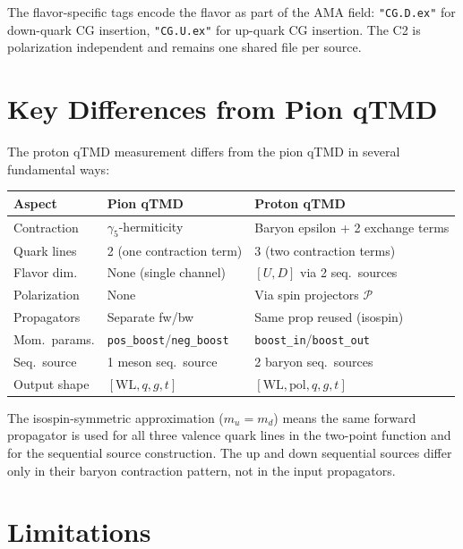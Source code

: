 \documentclass[11pt,a4paper]{article}
\begin{document}
The flavor-specific tags encode the flavor as part of the AMA field:
\texttt{"CG.D.ex"} for down-quark CG insertion, \texttt{"CG.U.ex"} for up-quark
CG insertion.  The C2 is polarization independent and remains one shared file
per source.

\section{Key Differences from Pion qTMD}
\label{sec:differences}

The proton qTMD measurement differs from the pion qTMD in several fundamental ways:

\begin{center}
  \begin{tabular}{l|l|l}
    Aspect & Pion qTMD & Proton qTMD \\
    \hline
    Contraction & $\gamma_5$-hermiticity & Baryon epsilon + 2 exchange terms \\
    Quark lines & 2 (one contraction term) & 3 (two contraction terms) \\
    Flavor dim. & None (single channel) & $[U, D]$ via 2 seq.\ sources \\
    Polarization & None & Via spin projectors $\mathcal{P}$ \\
    Propagators & Separate fw/bw & Same prop reused (isospin) \\
    Mom.\ params. & \texttt{pos\_boost}/\texttt{neg\_boost} &
      \texttt{boost\_in}/\texttt{boost\_out} \\
    Seq.\ source & 1 meson seq.\ source & 2 baryon seq.\ sources \\
    Output shape & $[\text{WL}, q, g, t]$ &
      $[\text{WL}, \text{pol}, q, g, t]$
  \end{tabular}
\end{center}

The isospin-symmetric approximation ($m_u = m_d$) means the same forward propagator
is used for all three valence quark lines in the two-point function and for the
sequential source construction. The up and down sequential sources differ only in
their baryon contraction pattern, not in the input propagators.

\section{Limitations}
\label{sec:limitations}
\end{document}
